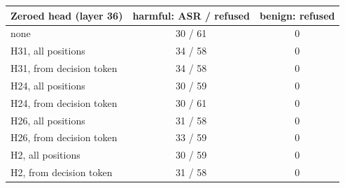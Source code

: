 \begin{tabular}{lcc}
\toprule
Zeroed head (layer 36) & harmful: ASR / refused & benign: refused \\
\midrule
none & 30 / 61 & 0 \\
H31, all positions & 34 / 58 & 0 \\
H31, from decision token & 34 / 58 & 0 \\
H24, all positions & 30 / 59 & 0 \\
H24, from decision token & 30 / 61 & 0 \\
H26, all positions & 31 / 58 & 0 \\
H26, from decision token & 33 / 59 & 0 \\
H2, all positions & 30 / 59 & 0 \\
H2, from decision token & 31 / 58 & 0 \\
\bottomrule
\end{tabular}
